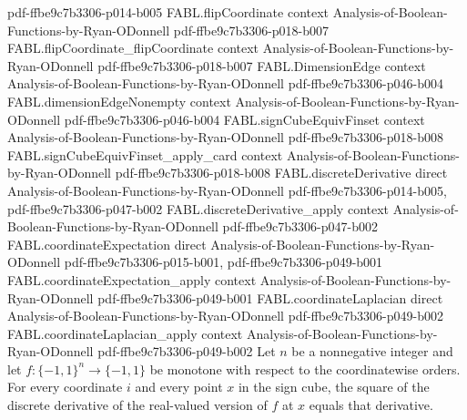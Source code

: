 \begin{theorem}
  {pdf-ffbe9c7b3306-p014-b005}
\proofstep
  {FABL.flipCoordinate}
  {context}
  {Analysis-of-Boolean-Functions-by-Ryan-ODonnell}
  {pdf-ffbe9c7b3306-p018-b007}
\proofstep
  {FABL.flipCoordinate_flipCoordinate}
  {context}
  {Analysis-of-Boolean-Functions-by-Ryan-ODonnell}
  {pdf-ffbe9c7b3306-p018-b007}
\proofstep
  {FABL.DimensionEdge}
  {context}
  {Analysis-of-Boolean-Functions-by-Ryan-ODonnell}
  {pdf-ffbe9c7b3306-p046-b004}
\proofstep
  {FABL.dimensionEdgeNonempty}
  {context}
  {Analysis-of-Boolean-Functions-by-Ryan-ODonnell}
  {pdf-ffbe9c7b3306-p046-b004}
\proofstep
  {FABL.signCubeEquivFinset}
  {context}
  {Analysis-of-Boolean-Functions-by-Ryan-ODonnell}
  {pdf-ffbe9c7b3306-p018-b008}
\proofstep
  {FABL.signCubeEquivFinset_apply_card}
  {context}
  {Analysis-of-Boolean-Functions-by-Ryan-ODonnell}
  {pdf-ffbe9c7b3306-p018-b008}
\proofstep
  {FABL.discreteDerivative}
  {direct}
  {Analysis-of-Boolean-Functions-by-Ryan-ODonnell}
  {pdf-ffbe9c7b3306-p014-b005,
    pdf-ffbe9c7b3306-p047-b002}
\proofstep
  {FABL.discreteDerivative_apply}
  {context}
  {Analysis-of-Boolean-Functions-by-Ryan-ODonnell}
  {pdf-ffbe9c7b3306-p047-b002}
\proofstep
  {FABL.coordinateExpectation}
  {direct}
  {Analysis-of-Boolean-Functions-by-Ryan-ODonnell}
  {pdf-ffbe9c7b3306-p015-b001,
    pdf-ffbe9c7b3306-p049-b001}
\proofstep
  {FABL.coordinateExpectation_apply}
  {context}
  {Analysis-of-Boolean-Functions-by-Ryan-ODonnell}
  {pdf-ffbe9c7b3306-p049-b001}
\proofstep
  {FABL.coordinateLaplacian}
  {direct}
  {Analysis-of-Boolean-Functions-by-Ryan-ODonnell}
  {pdf-ffbe9c7b3306-p049-b002}
\proofstep
  {FABL.coordinateLaplacian_apply}
  {context}
  {Analysis-of-Boolean-Functions-by-Ryan-ODonnell}
  {pdf-ffbe9c7b3306-p049-b002}
Let $n$ be a nonnegative integer and let $f:\{-1,1\}^n\to\{-1,1\}$ be monotone with
respect to the coordinatewise orders. For every coordinate $i$ and every point $x$ in
the sign cube, the square of the discrete derivative of the real-valued version of $f$
at $x$ equals that derivative.
\end{theorem}

